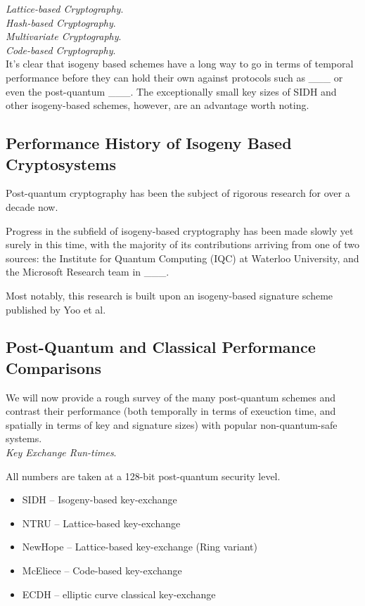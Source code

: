 \noindent
\textit{Lattice-based Cryptography}.\\

\noindent
\textit{Hash-based Cryptography}.\\

\noindent
\textit{Multivariate Cryptography}.\\

\noindent
\textit{Code-based Cryptography}.\\


It's clear that isogeny based schemes have a long way to go in terms of temporal performance before they can hold their own against protocols such as \_\_\_ or even the post-quantum \_\_\_. The exceptionally small key sizes of SIDH and other isogeny-based schemes, however, are an advantage worth noting. 


\subsection{Performance History of Isogeny Based Cryptosystems}

Post-quantum cryptography has been the subject of rigorous research for over a decade now. 

Progress in the subfield of isogeny-based cryptography has been made slowly yet surely in this time, with the majority of its contributions arriving from one of two sources: the Institute for Quantum Computing (IQC) at Waterloo University, and the Microsoft Research team in \_\_\_. 

Most notably, this research is built upon an isogeny-based signature scheme published by Yoo et al. 

\subsection{Post-Quantum and Classical Performance Comparisons}

We will now provide a rough survey of the many post-quantum schemes and contrast their performance (both temporally in terms of exeuction time, and spatially in terms of key and signature sizes) with popular non-quantum-safe systems.\\

\noindent
\textit{Key Exchange Run-times}.

All numbers are taken at a 128-bit post-quantum security level.

\begin{itemize}
\item SIDH -- Isogeny-based key-exchange
\item NTRU -- Lattice-based key-exchange
\item NewHope -- Lattice-based key-exchange (Ring variant)
\item McEliece -- Code-based key-exchange
\item ECDH -- elliptic curve classical key-exchange
\end{itemize}

